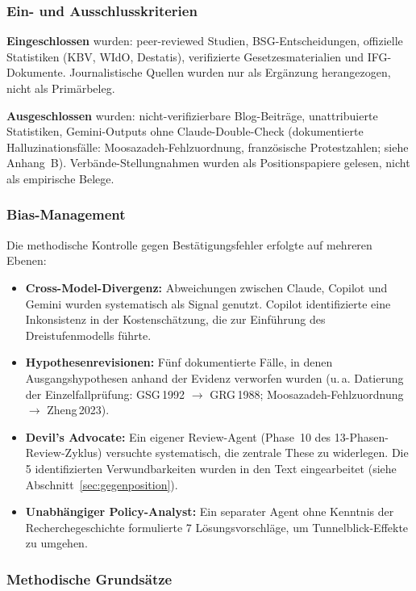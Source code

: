 \documentclass{umbruch-position}
\begin{document}
\subsubsection{Ein- und Ausschlusskriterien}

\textbf{Eingeschlossen} wurden: peer-reviewed Studien, BSG-Entscheidungen, offizielle Statistiken (KBV, WIdO, Destatis), verifizierte Gesetzesmaterialien und IFG-Dokumente. Journalistische Quellen wurden nur als Ergänzung herangezogen, nicht als Primärbeleg.

\textbf{Ausgeschlossen} wurden: nicht-verifizierbare Blog-Beiträge, unattribuierte Statistiken, Gemini-Outputs ohne Claude-Double-Check (dokumentierte Halluzinationsfälle: Moosazadeh-Fehlzuordnung, französische Protestzahlen; siehe Anhang~B). Verbände-Stellungnahmen wurden als Positionspapiere gelesen, nicht als empirische Belege.

\subsubsection{Bias-Management}

Die methodische Kontrolle gegen Bestätigungsfehler erfolgte auf mehreren Ebenen:

\begin{itemize}[nosep]
  \item \textbf{Cross-Model-Divergenz:} Abweichungen zwischen Claude, Copilot und Gemini wurden systematisch als Signal genutzt. Copilot identifizierte eine Inkonsistenz in der Kostenschätzung, die zur Einführung des Dreistufenmodells führte.
  \item \textbf{Hypothesenrevisionen:} Fünf dokumentierte Fälle, in denen Ausgangshypothesen anhand der Evidenz verworfen wurden (u.\,a. Datierung der Einzelfallprüfung: GSG\,1992 $\rightarrow$ GRG\,1988; Moosazadeh-Fehlzuordnung $\rightarrow$ Zheng\,2023).
  \item \textbf{Devil's Advocate:} Ein eigener Review-Agent (Phase~10 des 13-Phasen-Review-Zyklus) versuchte systematisch, die zentrale These zu widerlegen. Die 5 identifizierten Verwundbarkeiten wurden in den Text eingearbeitet (siehe Abschnitt~\ref{sec:gegenposition}).
  \item \textbf{Unabhängiger Policy-Analyst:} Ein separater Agent ohne Kenntnis der Recherchegeschichte formulierte 7 Lösungsvorschläge, um Tunnelblick-Effekte zu umgehen.
\end{itemize}

\subsubsection{Methodische Grundsätze}
\end{document}
